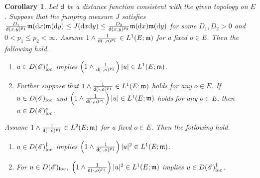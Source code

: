\documentclass[12pt,a4paper]{article}
\newtheorem{cor}[thm]{Corollary}
\renewcommand{\d}{\mathrm{d}}
\newcommand{\m}{\mathfrak{m} }
\newcommand{\loc}{{\rm loc}}
\newcommand{\1}{{\bf 1}}
\begin{document}
\begin{cor}\label{cor:intgrabilityequivalence}
Let ${\sf d}$ be a distance function consistent with the given topology on 
 $E$.
Suppose that the jumping measure $J$ satisfies $\frac{D_1}{{\sf d}(x,y)^{p_1}}{\m}({\d} x){\m}({\d} y)\leq 
J({\d} x{\d} y)\leq \frac{D_2}{{\sf d}(x,y)^{p_2}}{\m}({\d} x){\m}({\d} y)$ for some $D_1,D_2>0$ and $0<p_1\leq p_2<\infty$.
Assume $1\land\frac{1}{{\sf d}(\cdot,o)^{p_1}}\in L^1(E;{\m})$ for a fixed $o\in E$. 
Then the following hold. 
\begin{enumerate}
\item[\rm(1)]
$u\in D(\mathscr{E})^{\diamond}_{\loc}$ implies 
$\left(1\land \frac{1}{{\sf d}(\cdot,o)^{p_1}} \right)|u|\in L^1(E;{\m})$.
\item[\rm(2)] Further suppose that 
$1\land\frac{1}{{\sf d}(\cdot,o)^{p_1}}\in L^1(E;{\m})$ holds for any $o\in E$. 
If $u\in D(\mathscr{E})_{\loc}$ and  
$\left(1\land \frac{1}{{\sf d}(\cdot,o)^{p_1}} \right)|u|\in L^1(E;{\m})$ holds for any $o\in E$, then $u\in D(\mathscr{E})^{\diamond}_{\loc}$.
\end{enumerate}
Assume $1\land\frac{1}{{\sf d}(\cdot,o)^{p_1}}\in L^2(E;{\m})$ 
for a fixed $o\in E$. 
Then the following hold. 
\begin{enumerate}
\item[\rm(3)]
$u\in D(\mathscr{E})^{\dag}_{\loc}$ implies 
$\left(1\land \frac{1}{{\sf d}(\cdot,o)^{p_1}} \right)|u|^2\in L^1(E;{\m})$.
\item[\rm(4)] For $u\in D(\mathscr{E})_{\loc}$, 
$\left(1\land \frac{1}{{\sf d}(\cdot,o)^{p_1}} \right)|u|^2\in L^1(E;{\m})$ implies $u\in D(\mathscr{E})^{\dag}_{\loc}$.
\end{enumerate}
\end{cor}
\end{document}
